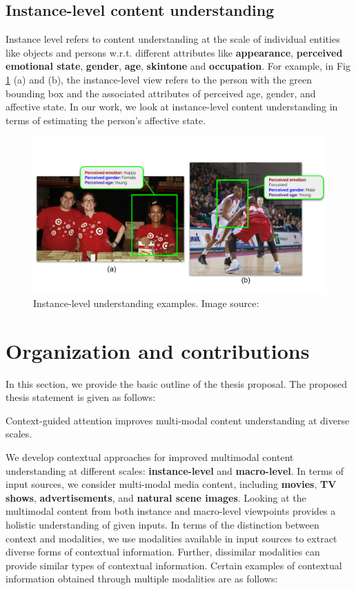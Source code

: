 \subsection{Instance-level content understanding}
Instance level refers to content understanding at the scale of individual entities like objects and persons w.r.t. different attributes like \textbf{appearance}, \textbf{perceived emotional state}, \textbf{gender}, \textbf{age}, \textbf{skintone} and \textbf{occupation}. For example, in Fig \ref{instance_scale_understanding} (a) and (b), the instance-level view refers to the person with the green bounding box and the associated attributes of perceived age, gender, and affective state. In our work, we look at instance-level content understanding in terms of estimating the person's affective state.
\begin{figure}
 \centering
    \includegraphics[width=\textwidth]{figures/instance_level_scale_understanding.pdf}
    \caption{Instance-level understanding examples. Image source: \cite{Gustafson2023FACETFI}}
    \label{instance_scale_understanding}
\end{figure}
\section{Organization and contributions}
In this section, we provide the basic outline of the thesis proposal. The proposed thesis statement is given as follows:
\begin{tcolorbox}[width=\textwidth]
Context-guided attention improves multi-modal content understanding at diverse scales.
\end{tcolorbox}
We develop contextual approaches for improved multimodal content understanding at different scales: \textbf{instance-level} and \textbf{macro-level}.  In terms of input sources, we consider multi-modal media content, including \textbf{movies}, \textbf{TV shows}, \textbf{advertisements}, and \textbf{natural scene images}. Looking at the multimodal content from both instance and macro-level viewpoints provides a holistic understanding of given inputs. In terms of the distinction between context and modalities, we use modalities available in input sources to extract diverse forms of contextual information. Further, dissimilar modalities can provide similar types of contextual information. Certain examples of contextual information obtained through multiple modalities are as follows: 

